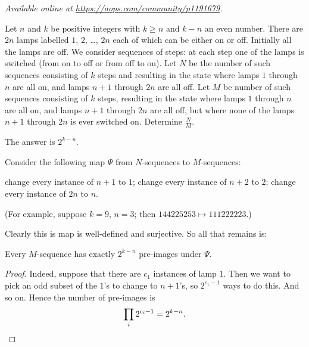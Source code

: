 \textsl{Available online at \url{https://aops.com/community/p1191679}.}
\begin{mdframed}[style=mdpurplebox,frametitle={Problem statement}]
Let $n$ and $k$ be positive integers with $k \geq n$ and $k - n$ an even number.
There are $2n$ lamps labelled $1$, $2$, \dots, $2n$ each of which can be either on or off.
Initially all the lamps are off.
We consider sequences of steps: at each step one of the lamps is switched
(from on to off or from off to on).
Let $N$ be the number of such sequences consisting of $k$ steps
and resulting in the state where lamps $1$ through $n$ are all on,
and lamps $n + 1$ through $2n$ are all off.
Let $M$ be number of such sequences consisting of $k$ steps,
resulting in the state where lamps $1$ through $n$ are all on,
and lamps $n + 1$ through $2n$ are all off,
but where none of the lamps $n + 1$ through $2n$ is ever switched on.
Determine $\frac{N}{M}$.
\end{mdframed}
The answer is $2^{k-n}$.

Consider the following map $\Psi$ from $N$-sequences to $M$-sequences:
\begin{itemize}
  \ii change every instance of $n+1$ to $1$;
  \ii change every instance of $n+2$ to $2$;
  \ii[$\vdots$]
  \ii change every instance of $2n$ to $n$.
\end{itemize}
(For example, suppose $k=9$, $n=3$;
then $144225253 \mapsto 111222223$.)

Clearly this is map is well-defined and surjective.
So all that remains is:
\begin{claim*}
  Every $M$-sequence has exactly $2^{k-n}$ pre-images under $\Psi$.
\end{claim*}
\begin{proof}
  Indeed, suppose that there are $c_1$ instances of lamp $1$.
  Then we want to pick an odd subset of the $1$'s to change to $n+1$'s,
  so $2^{c_1 - 1}$ ways to do this.
  And so on.
  Hence the number of pre-images is
  \[ \prod_i 2^{c_i - 1} = 2^{k-n}. \qedhere \]
\end{proof}
\pagebreak
